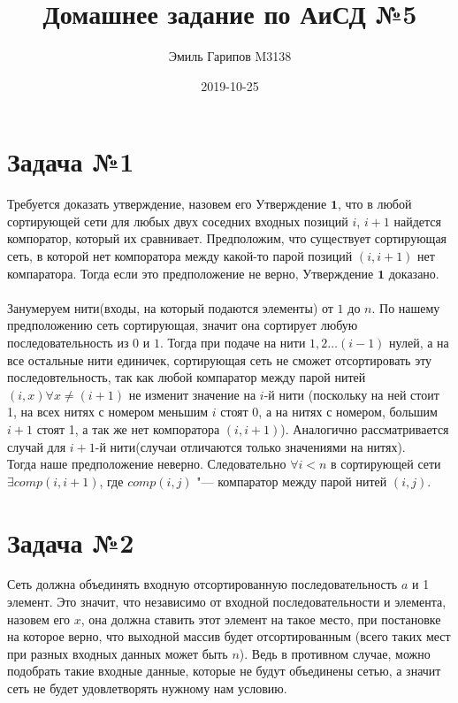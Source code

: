 \documentclass{article}
\title{Домашнее задание по АиСД №5}
\date{2019-10-25}
\author{Эмиль Гарипов M3138}
\begin{document}

\maketitle
\newpage
{}

\section*{Задача №1}
Требуется доказать утверждение, назовем его $\textbf{Утверждение 1}$, что в любой сортирующей сети для любых двух соседних входных позиций $i$, $i + 1$ найдется компоратор, который их сравнивает.
Предположим, что существует сортирующая сеть, в которой нет компоратора между какой-то парой позиций $(i, i + 1)$ нет компаратора. Тогда если это предположение не верно, $\textbf{Утверждение 1}$ доказано.
\\\\Занумеруем нити(входы, на который подаются элементы) от $1$ до $n$. По нашему предположению сеть сортирующая, значит она сортирует любую последовательность из $0$ и $1$. Тогда при подаче на нити $1, 2 \ldots (i - 1)$ нулей, а на все остальные нити единичек, сортирующая сеть не сможет отсортировать эту последовтельность, так как любой компаратор между парой нитей $(i, x) \forall x \neq (i + 1)$ не изменит значение на $i$-й нити (поскольку на ней стоит 1, на всех нитях с номером меньшим $i$ стоят 0, а на нитях с номером, большим $i + 1$ стоят 1, а так же нет компоратора $(i, i + 1)$). Аналогично рассматривается случай для $i + 1$-й нити(случаи отличаются только значениями на нитях).\\ Тогда наше предположение неверно. Следовательно $\forall i < n$ в сортирующей сети $\exists comp(i, i + 1)$, где $comp(i, j)$ "--- компаратор между парой нитей $(i, j)$.

\section*{Задача №2}
Сеть должна объединять входную отсортированную последовательность $a$ и 1 элемент. Это значит, что независимо от входной последовательности и элемента, назовем его $x$, она должна ставить этот элемент на такое место, при постановке на которое верно, что выходной массив будет отсортированным (всего таких мест при разных входных данных может быть $n$). Ведь в противном случае, можно подобрать такие входные данные, которые не будут объединены сетью, а значит сеть не будет удовлетворять нужному нам условию. 
\end{document}

